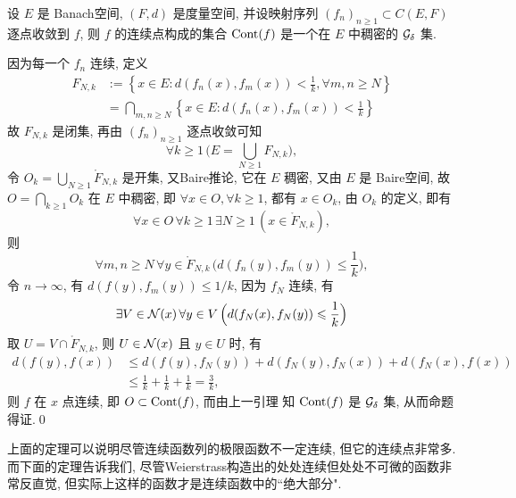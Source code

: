 	\begin{Theorem}
		设 $ E $ 是 Banach空间, $ (F, d) $  是度量空间, 并设映射序列 $ (f_{n})_{n\geqslant1}\subset C(E, F) $ 逐点收敛到 $ f $, 则 $ f $ 的连续点构成的集合 $ \operatorname{Cont}(f) $ 是一个在 $ E $ 中稠密的 $ \mathcal{G}_{\delta} $ 集. 
	\end{Theorem}
	\begin{Proof}
		因为每一个 $ f_{n} $ 连续, 定义
		\[
			\begin{aligned}
				F_{N, k} & :=\left\{ x\in E: d(f_{n}(x), f_{m}(x))<\frac{1}{k}, \forall m, n\geqslant N \right\} \\
				& = \bigcap_{m,n\geqslant N}\left\{ x\in E: d(f_{n}(x), f_{m}(x))<\frac{1}{k} \right\}
			\end{aligned}
		\]
		故 $ F_{N, k} $ 是闭集, 再由 $ (f_{n})_{n\geqslant1} $ 逐点收敛可知
		\[
			\forall k\geqslant1\,\Big(E=\bigcup_{N\geqslant1}F_{N, k}\Big),
		\]
		令 $ O_{k}=\bigcup_{N\geqslant1}\mathring{F}_{N, k} $ 是开集, 又Baire推论, 它在 $ E $ 稠密, 又由 $ E $ 是 Baire空间, 故 $ O=\bigcap_{k\geqslant1}O_{k} $ 在 $ E $ 中稠密, 即 $ \forall x\in O, \forall k\geqslant1 $, 都有 $ x\in O_{k} $, 由 $ O_{k} $ 的定义, 即有
		\[
			\forall x\in O\,\forall k\geqslant1\,\exists N\geqslant1\,(x\in\mathring{F}_{N, k}),
		\]
		则
		\[
			\forall m, n\geqslant N\,\forall y\in\mathring{F}_{N, k}\,\Big(d(f_{n}(y), f_{m}(y))\leqslant\frac{1}{k}\Big),
		\]
		令 $ n\to\infty $, 有 $ d(f(y), f_{m}(y))\leqslant1/k $, 因为 $ f_{N} $ 连续, 有
		\[
			\exists V\in\mathcal{N}(x)\,\forall y\in V\,\Big( d(f_{N}(x), f_{N}(y))\leqslant\frac{1}{k} \Big)
		\]
		取 $ U = V\cap\mathring{F}_{N, k} $, 则 $ U\in\mathcal{N}(x) $ 且 $ y\in U $ 时, 有
		\[
			\begin{aligned}
				d(f(y), f(x)) & \leqslant d(f(y), f_{N}(y))+d(f_{N}(y), f_{N}(x))+d(f_{N}(x), f(x))\\
				& \leqslant \frac{1}{k}+\frac{1}{k}+\frac{1}{k}=\frac{3}{k},
			\end{aligned}
		\]
		则 $ f $ 在 $ x $ 点连续, 即 $ O\subset\operatorname{Cont}(f) $, 而由上一引理 知 $ \operatorname{Cont}(f) $ 是 $ \mathcal{G}_{\delta} $ 集, 从而命题得证.\qed
	\end{Proof}
	上面的定理可以说明尽管连续函数列的极限函数不一定连续, 但它的连续点非常多. 而下面的定理告诉我们, 尽管Weierstrass构造出的处处连续但处处不可微的函数非常反直觉, 但实际上这样的函数才是连续函数中的``绝大部分".
	
